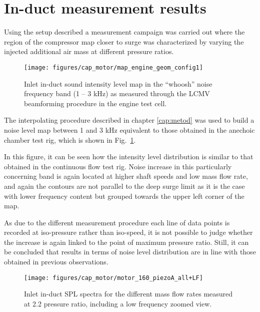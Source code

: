 \section{In-duct measurement results}

Using the setup described a measurement campaign was carried out where the region of the compressor map closer to surge was characterized by varying the injected additional air mass at different pressure ratios.

\begin{figure}[b!]
\centering
\vspace{-5mm}
\texttt{[image: figures/cap\_motor/map\_engine\_geom\_config1]}
\vspace{-5mm}
\caption{Inlet in-duct sound intensity level map in the ``whoosh'' noise frequency band (1 -- 3 kHz) as measured through the LCMV beamforming procedure in the engine test cell.}
\label{fig:mot_map_engine_geom_config1}
\end{figure}

The interpolating procedure described in chapter \ref{cap:metod} was used to build a noise level map between 1 and 3 kHz equivalent to those obtained in the anechoic chamber test rig, which is shown in Fig.~\ref{fig:mot_map_engine_geom_config1}.

In this figure, it can be seen how the intensity level distribution is similar to that obtained in the continuous flow test rig. Noise increase in this particularly concerning band is again located at higher shaft speeds and low mass flow rate, and again the contours are not parallel to the deep surge limit as it is the case with lower frequency content but grouped towards the upper left corner of the map.

As due to the different measurement procedure each line of data points is recorded at iso-pressure rather than iso-speed, it is not possible to judge whether the increase is again linked to the point of maximum pressure ratio. Still, it can be concluded that results in terms of noise level distribution are in line with those obtained in previous observations.

\begin{figure}[htb!]
\centering
\texttt{[image: figures/cap\_motor/motor\_160\_piezoA\_all+LF]}
\caption{Inlet in-duct SPL spectra for the different mass flow rates measured at 2.2 pressure ratio, including a low frequency zoomed view.}
\label{fig:motor_160_piezoA_all+LF}
\end{figure}

